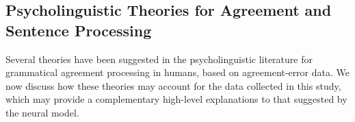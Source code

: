 





\subsection{Psycholinguistic Theories for Agreement and Sentence Processing}
Several theories have been suggested in the psycholinguistic literature for grammatical agreement processing in humans, based on agreement-error data. We now discuss how these theories may account for the data collected in this study, which may provide a complementary high-level explanations to that suggested by the neural model. 



